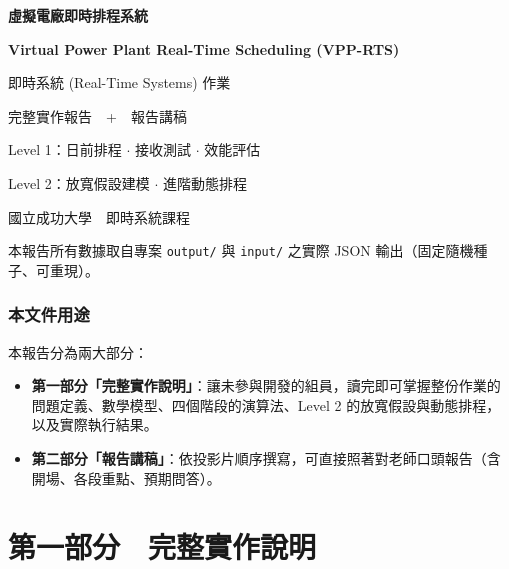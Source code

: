 \documentclass[12pt,a4paper,fontset=none]{ctexart}
\newcommand{\fn}[1]{\texttt{\small #1}}
\begin{document}
\begin{titlepage}
\centering
\vspace*{2.5cm}
{\Huge\bfseries\color{vblue} 虛擬電廠即時排程系統\par}
\vspace{0.4cm}
{\LARGE\bfseries Virtual Power Plant Real-Time Scheduling (VPP-RTS)\par}
\vspace{1.2cm}
{\Large 即時系統 (Real-Time Systems) 作業\par}
\vspace{0.3cm}
{\large 完整實作報告　+　報告講稿\par}
\vspace{1.5cm}
{\large Level 1：日前排程 $\cdot$ 接收測試 $\cdot$ 效能評估\par}
{\large Level 2：放寬假設建模 $\cdot$ 進階動態排程\par}
\vspace{2.0cm}
{\large 國立成功大學　即時系統課程\par}
\vfill
{\small 本報告所有數據取自專案 \fn{output/} 與 \fn{input/} 之實際 JSON 輸出（固定隨機種子、可重現）。\par}
\end{titlepage}

\section*{本文件用途}
本報告分為兩大部分：
\begin{itemize}
  \item \textbf{第一部分「完整實作說明」}：讓未參與開發的組員，讀完即可掌握整份作業的問題定義、數學模型、四個階段的演算法、Level 2 的放寬假設與動態排程，以及實際執行結果。
  \item \textbf{第二部分「報告講稿」}：依投影片順序撰寫，可直接照著對老師口頭報告（含開場、各段重點、預期問答）。
\end{itemize}

\tableofcontents
\newpage

\part*{第一部分　完整實作說明}
\end{document}
